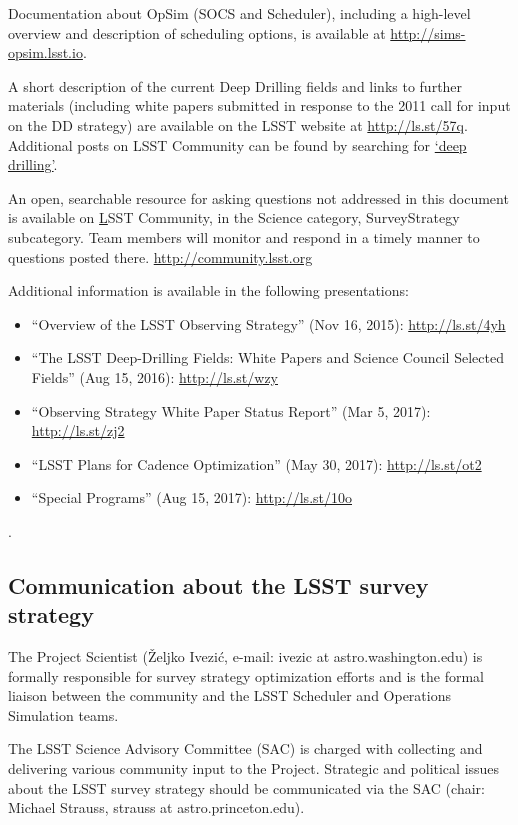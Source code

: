 \documentclass[DM,lsstdraft,toc,usenatbib]{lsstdoc}
\begin{document}
Documentation about OpSim (SOCS and Scheduler), including a high-level overview and description of scheduling options, is available at \url{http://sims-opsim.lsst.io}.

A short description of the current Deep Drilling fields and links to further materials (including white papers submitted in response to the 2011 call for input on the DD strategy) are available on the LSST website at \href{https://www.lsst.org/scientists/survey-design/ddf}{http://ls.st/57q}. Additional posts on LSST Community can be found by searching for \href{https://community.lsst.org/search?q=deep%20drilling}{`deep drilling'}. 

An open, searchable resource for asking questions not addressed in this document is available on \href{http://community.lsst.org}LSST Community, in the Science category, SurveyStrategy subcategory. Team members will monitor and respond in a timely manner to questions posted there.  \url{http://community.lsst.org}

Additional information is available in the following presentations:
\begin{itemize}
\item ``Overview of the LSST Observing Strategy'' (Nov 16, 2015): \url{http://ls.st/4yh}
\item ``The LSST Deep-Drilling Fields: White Papers and Science Council Selected Fields'' (Aug 15, 2016): \url{http://ls.st/wzy}
\item ``Observing Strategy White Paper Status Report'' (Mar 5, 2017): \url{http://ls.st/zj2}
\item ``LSST Plans for Cadence Optimization'' (May 30, 2017): \url{http://ls.st/ot2}
\item ``Special Programs'' (Aug 15, 2017): \url{http://ls.st/10o}
\end{itemize}.


\subsection{Communication about the LSST survey strategy} 

The Project Scientist (\v{Z}eljko Ivezi\'{c}, e-mail: ivezic at astro.washington.edu) is formally responsible for survey strategy optimization efforts and is the formal liaison between the community and the LSST Scheduler and Operations Simulation teams.

The LSST Science Advisory Committee (SAC) is charged with collecting and delivering various community input to the Project. Strategic and political issues about the LSST survey strategy should be communicated via the SAC (chair: Michael Strauss, strauss at astro.princeton.edu).
\end{document}
